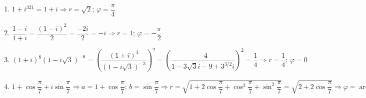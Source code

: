 \documentclass{report}
\begin{document}
\sol
\begin{enumerate}
\item $1+i^{321} = 1+i \Rightarrow r=\sqrt{2};\, \varphi=\dfrac{\pi}{4}$
\item $\dfrac{1-i}{1+i} =\dfrac{(1-i)^2}{2}=\dfrac{-2i}{2}=-i \Rightarrow r=1;\, \varphi=-\dfrac{\pi}{2}$
\item $(1+i)^{8}(1-i \sqrt{3})^{-6}=\left(\dfrac{(1+i)^4}{(1-i\sqrt{3})^{-3}}\right)^2=\left(\dfrac{-4}{1-3\sqrt{3}i-9+3^{3/2}i}\right)^2=\dfrac{1}{4} \Rightarrow r=\dfrac{1}{4}; \, \varphi=0$
\item $1+\cos \dfrac{\pi}{7}+i \sin \dfrac{\pi}{7} \Rightarrow a=1+\cos{\dfrac{\pi}{7}}; \, b=\sin{\dfrac{\pi}{7}} \Rightarrow r=\sqrt{1+2\cos{\dfrac{\pi}{7}}+\cos^2{\dfrac{\pi}{7}}+\sin^2{\dfrac{\pi}{7}}}=
	\sqrt{2+2\cos{\dfrac{\pi}{7}}} \Rightarrow \varphi=\arctan{\dfrac{\sin{\pi/7}}{1+\cos{\pi/7}}}$
\end{enumerate}



\sol
\end{document}
